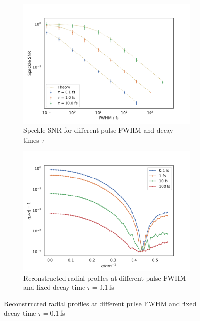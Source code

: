 \begin{figure}
	\begin{subfigure}[b]{0.45\textwidth}
		\includegraphics[width=\linewidth]{images/timedependent_1.pdf}
		\caption{Speckle SNR for different pulse FWHM and decay times $\tau$}
	\end{subfigure}
	\begin{subfigure}[b]{0.45\textwidth}
		\includegraphics[width=\linewidth]{images/tdsphere.pdf}
		\caption{Reconstructed radial profiles at different pulse FWHM and fixed decay time $\tau = 0.1$\,fs}
	\end{subfigure}


\end{figure}
